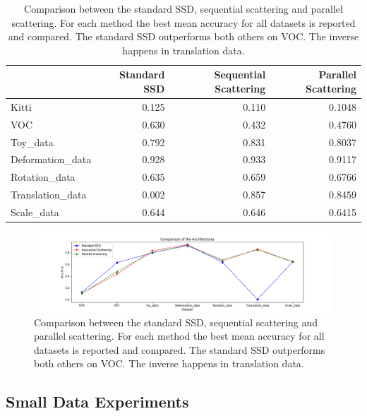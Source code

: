 \begin{table}[!htb]
	\centering
	\caption{Comparison between the standard SSD, sequential scattering and parallel scattering. For each method the best mean accuracy for all datasets is reported and compared. The standard SSD outperforms both others on VOC. The inverse happens in translation data.}
	\begin{tabular}{lrrr}
		\toprule
		{} &  Standard SSD &  Sequential Scattering &  Parallel Scattering \\
		\midrule
		Kitti            &         0.125 &                  0.110 &               0.1048 \\
		VOC              &         0.630 &                  0.432 &               0.4760 \\
		Toy\_data         &         0.792 &                  0.831 &               0.8037 \\
		Deformation\_data &         0.928 &                  0.933 &               0.9117 \\
		Rotation\_data    &         0.635 &                  0.659 &               0.6766 \\
		Translation\_data &         0.002 &                  0.857 &               0.8459 \\
		Scale\_data       &         0.644 &                  0.646 &               0.6415 \\
		\bottomrule
	\end{tabular}
	
	
	\label{table:comparison}
\end{table}

\begin{figure}[!htb]
	\centering
	\includegraphics[width=\textwidth]{images/comparison.png}
	\caption{Comparison between the standard SSD, sequential scattering and parallel scattering. For each method the best mean accuracy for all datasets is reported and compared. The standard SSD outperforms both others on VOC. The inverse happens in translation data.}
	\label{fig:comparison}
\end{figure}

\subsection{Small Data Experiments}
\label{subsec:small_data_results}

